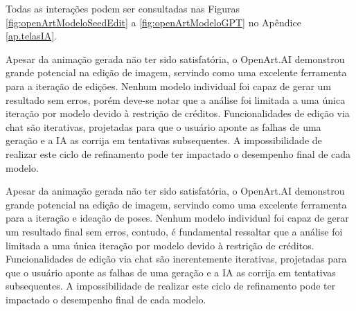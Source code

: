 Todas as interações podem ser consultadas nas Figuras \ref{fig:openArtModeloSeedEdit} a \ref{fig:openArtModeloGPT} no Apêndice \ref{ap.telasIA}.

Apesar da animação gerada não ter sido satisfatória, o OpenArt.AI demonstrou grande potencial na edição de imagem, servindo como uma excelente ferramenta para a iteração de edições. Nenhum modelo individual foi capaz de gerar um resultado sem erros, porém deve-se notar que a análise foi limitada a uma única iteração por modelo devido à restrição de créditos. Funcionalidades de edição via chat são iterativas, projetadas para que o usuário aponte as falhas de uma geração e a IA as corrija em tentativas subsequentes. A impossibilidade de realizar este ciclo de refinamento pode ter impactado o desempenho final de cada modelo.

Apesar da animação gerada não ter sido satisfatória, o OpenArt.AI demonstrou grande potencial na edição de imagem, servindo como uma excelente ferramenta para a iteração e ideação de poses. Nenhum modelo individual foi capaz de gerar um resultado final sem erros, contudo, é fundamental ressaltar que a análise foi limitada a uma única iteração por modelo devido à restrição de créditos. Funcionalidades de edição via chat são inerentemente iterativas, projetadas para que o usuário aponte as falhas de uma geração e a IA as corrija em tentativas subsequentes. A impossibilidade de realizar este ciclo de refinamento pode ter impactado o desempenho final de cada modelo.

